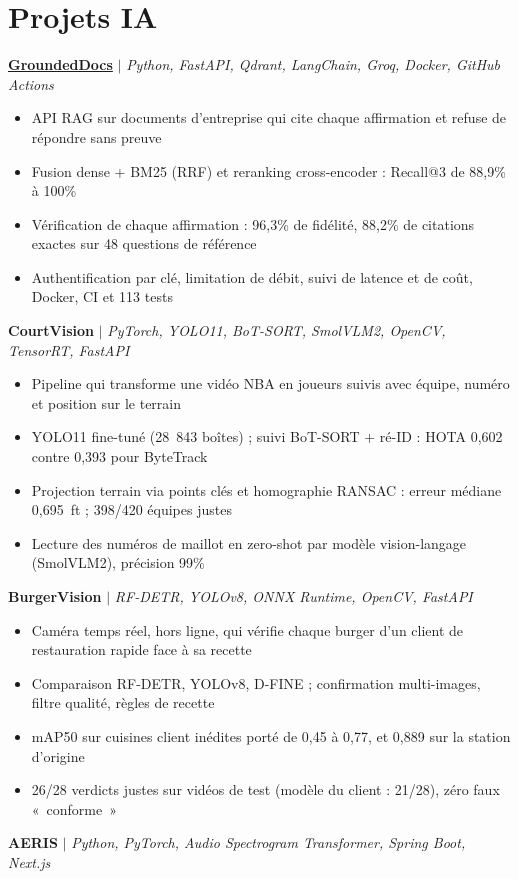 \documentclass[a4paper,11pt]{article}
\newenvironment{points}{\begin{itemize}[leftmargin=1.4em,itemsep=1pt,topsep=2pt,parsep=0pt]\small}{\end{itemize}\vspace{4pt}}
\newcommand{\proj}[2]{\textbf{#1} $|$ \textit{\small #2}\par}
\begin{document}
\section{Projets IA}
\proj{\href{https://github.com/ChedyKorbi/GroundedDocs}{GroundedDocs}}{Python, FastAPI, Qdrant, LangChain, Groq, Docker, GitHub Actions}
\begin{points}
  \item API RAG sur documents d'entreprise qui cite chaque affirmation et refuse de répondre sans preuve
  \item Fusion dense + BM25 (RRF) et reranking cross-encoder : Recall@3 de 88,9\% à 100\%
  \item Vérification de chaque affirmation : 96,3\% de fidélité, 88,2\% de citations exactes sur 48 questions de référence
  \item Authentification par clé, limitation de débit, suivi de latence et de coût, Docker, CI et 113 tests
\end{points}
\proj{CourtVision}{PyTorch, YOLO11, BoT-SORT, SmolVLM2, OpenCV, TensorRT, FastAPI}
\begin{points}
  \item Pipeline qui transforme une vidéo NBA en joueurs suivis avec équipe, numéro et position sur le terrain
  \item YOLO11 fine-tuné (28~843 boîtes) ; suivi BoT-SORT + ré-ID : HOTA 0,602 contre 0,393 pour ByteTrack
  \item Projection terrain via points clés et homographie RANSAC : erreur médiane 0,695~ft ; 398/420 équipes justes
  \item Lecture des numéros de maillot en zero-shot par modèle vision-langage (SmolVLM2), précision 99\%
\end{points}
\proj{BurgerVision}{RF-DETR, YOLOv8, ONNX Runtime, OpenCV, FastAPI}
\begin{points}
  \item Caméra temps réel, hors ligne, qui vérifie chaque burger d'un client de restauration rapide face à sa recette
  \item Comparaison RF-DETR, YOLOv8, D-FINE ; confirmation multi-images, filtre qualité, règles de recette
  \item mAP50 sur cuisines client inédites porté de 0,45 à 0,77, et 0,889 sur la station d'origine
  \item 26/28 verdicts justes sur vidéos de test (modèle du client : 21/28), zéro faux «~conforme~»
\end{points}
\proj{AERIS}{Python, PyTorch, Audio Spectrogram Transformer, Spring Boot, Next.js}
\end{document}

